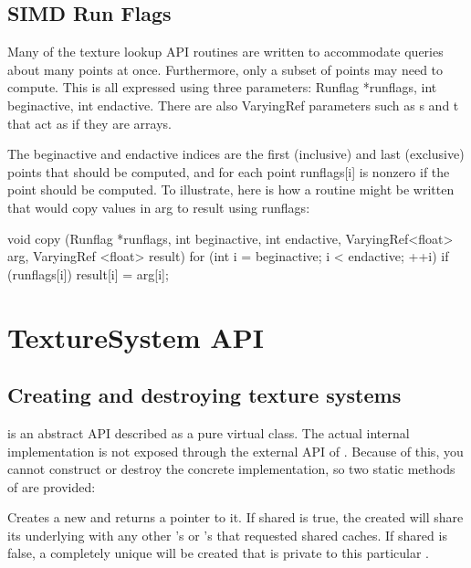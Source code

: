 \subsection{SIMD Run Flags}

Many of the texture lookup API routines are written to accommodate
queries about many points at once.  Furthermore, only a subset of
points may need to compute.  This is all expressed using three
parameters:  {\cf Runflag *runflags, int beginactive, int endactive}.
There are also {\cf VaryingRef} parameters such as {\cf s} and {\cf t}
that act as if they are arrays.

The {\cf beginactive} and {\cf endactive} indices are the first
(inclusive) and
last (exclusive) points that should be computed, and for each point
{\cf runflags[i]} is nonzero if the point should be computed.  To
illustrate, here is how a routine might be written that would copy
values in {\cf arg} to {\cf result} using runflags:

\begin{code}
        void copy (Runflag *runflags, int beginactive, int endactive,
                   VaryingRef<float> arg, VaryingRef <float> result)
        {
            for (int i = beginactive; i < endactive;  ++i)
                if (runflags[i])
                    result[i] = arg[i];
        }
\end{code}


\newpage
\section{TextureSystem API}
\label{sec:texturesys:api}

\subsection{Creating and destroying texture systems}
\label{sec:texturesys:api:createdestroy}

\TextureSystem is an abstract API described as a pure
virtual class.  The actual internal implementation is not exposed
through the external API of \product.  Because of this, you cannot
construct or destroy the concrete implementation, so two static
methods of \TextureSystem are provided:

Creates a new \TextureSystem and returns a pointer to it.
If {\cf shared} is {\cf true}, the \TextureSystem created will share its
underlying \ImageCache with any other \TextureSystem's or \ImageCache's
that requested shared caches.  If {\cf shared} is {\cf false}, a
completely unique \ImageCache will be created that is private to this
particular \TextureSystem.
\apiend

